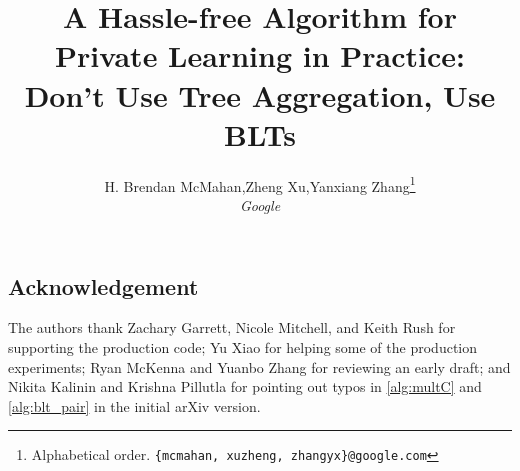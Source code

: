 \documentclass{article}
\title{A Hassle-free Algorithm for Private Learning in Practice: \\ Don't Use Tree Aggregation, Use BLTs
}
\author{
H. Brendan McMahan,\;\;Zheng Xu,\;\;Yanxiang Zhang\thanks{Alphabetical order. \texttt{\{mcmahan, xuzheng, zhangyx\}@google.com}}\vspace{0.5em}\\
\textit{Google}\vspace{0.5em}\\
}
\date{}
\begin{document}
\sloppy
{} 

\maketitle















\subsection*{Acknowledgement}
The authors thank Zachary Garrett, Nicole Mitchell, and Keith Rush for supporting the production code; Yu Xiao for helping some of the production experiments; Ryan McKenna and Yuanbo Zhang for reviewing an early draft; and Nikita Kalinin and Krishna Pillutla for pointing out typos in \cref{alg:multC} and \cref{alg:blt_pair} in the initial arXiv version.




\clearpage

\appendix
\sloppy

\end{document}

